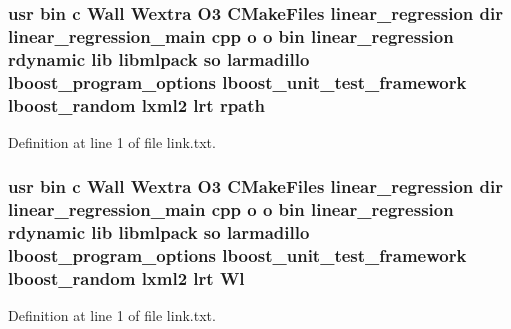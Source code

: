 \subsubsection[{rpath}]{\setlength{\rightskip}{0pt plus 5cm}usr bin c Wall Wextra O3 C\-Make\-Files linear\-\_\-regression dir linear\-\_\-regression\-\_\-main cpp o o bin linear\-\_\-regression rdynamic lib libmlpack so larmadillo lboost\-\_\-program\-\_\-options lboost\-\_\-unit\-\_\-test\-\_\-framework lboost\-\_\-random lxml2 lrt rpath}\label{methods_2linear__regression_2CMakeFiles_2linear__regression_8dir_2link_8txt_a11bf14bfe3ce5a1840dc39519626030e}


Definition at line 1 of file link.\-txt.

\subsubsection[{Wl}]{\setlength{\rightskip}{0pt plus 5cm}usr bin c Wall Wextra O3 C\-Make\-Files linear\-\_\-regression dir linear\-\_\-regression\-\_\-main cpp o o bin linear\-\_\-regression rdynamic lib libmlpack so larmadillo lboost\-\_\-program\-\_\-options lboost\-\_\-unit\-\_\-test\-\_\-framework lboost\-\_\-random lxml2 lrt Wl}\label{methods_2linear__regression_2CMakeFiles_2linear__regression_8dir_2link_8txt_a6d0aa49c668af2f3d86396d9e37388ad}


Definition at line 1 of file link.\-txt.

